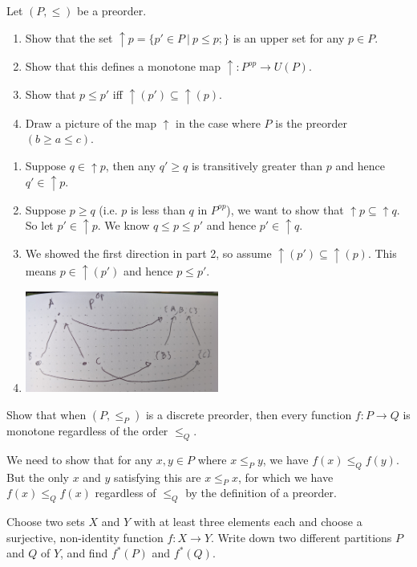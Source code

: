 Let $(P, \leq)$ be a preorder.
\begin{enumerate}
    \item Show that the set $\uparrow p = \{p'\in P\ |\ p\leq p;\}$ is an upper set for any $p\in P$.
    \item Show that this defines a monotone map $\uparrow: P^{op}\to U(P)$.
    \item Show that $p\leq p'$ iff $\uparrow(p')\subseteq\uparrow(p)$.
    \item Draw a picture of the map $\uparrow$ in the case where $P$ is the preorder $(b\geq a\leq c)$.
\end{enumerate}

\solution
\begin{enumerate}
    \item Suppose $q\in \uparrow p$, then any $q'\geq q$ is transitively greater than $p$ and hence $q'\in \uparrow p$.
    \item Suppose $p\geq q$ (i.e. $p$ is less than $q$ in $P^{op}$), we want to show that $\uparrow p \subseteq \uparrow q$.  So let $p'\in \uparrow p$.  We know $q\leq p\leq p'$ and hence $p'\in\uparrow q$.
    \item We showed the first direction in part 2, so assume $\uparrow(p')\subseteq \uparrow(p)$.  This means $p\in \uparrow(p')$ and hence $p\leq p'$.
    \item \includegraphics[width=0.5\textwidth]{images/1-66.jpg}
\end{enumerate}

Show that when $(P, \leq_P)$ is a discrete preorder, then every function $f:P\to Q$ is monotone regardless of the order $\leq_Q$.

\solution
We need to show that for any $x,y\in P$ where $x\leq_P y$, we have $f(x)\leq_Q f(y)$.  But the only $x$ and $y$ satisfying this are $x\leq_P x$, for which we have $f(x)\leq_Q f(x)$ regardless of $\leq_Q$ by the definition of a preorder.

Choose two sets $X$ and $Y$ with at least three elements each and choose a surjective, non-identity function $f:X\to Y$.  Write down two different partitions $P$ and $Q$ of $Y$, and find $f^*(P)$ and $f^*(Q)$.

